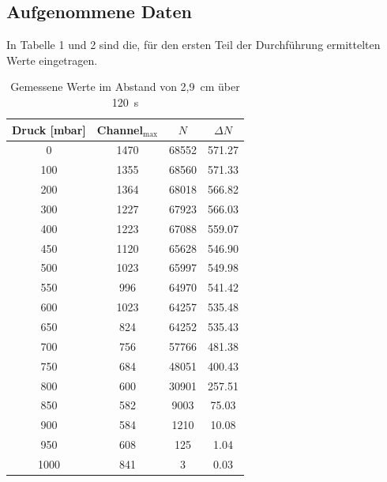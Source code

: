 \subsection{Aufgenommene Daten}
In Tabelle 1 und 2 sind die, für den ersten Teil der Durchführung ermittelten Werte eingetragen.
\begin{table}[H]
\renewcommand{\arraystretch}{.95}
\begin{tabular}{|c|c|c|c|} 
Druck [mbar]	&Channel$_\text{max}$	&$N$	&$\Delta N$\\ \hline
0		&1470	&68552	&571.27\\ \hline
100		&1355	&68560	&571.33\\ \hline
200		&1364	&68018	&566.82\\ \hline
300		&1227	&67923	&566.03\\ \hline
400		&1223	&67088	&559.07\\ \hline
450		&1120	&65628	&546.90\\ \hline
500		&1023	&65997	&549.98\\ \hline
550		&996	&64970	&541.42\\ \hline
600		&1023	&64257	&535.48\\ \hline
650		&824	&64252	&535.43\\ \hline
700		&756	&57766	&481.38\\ \hline
750		&684	&48051	&400.43\\ \hline
800		&600	&30901	&257.51\\ \hline
850		&582	&9003	&75.03\\ \hline
900		&584	&1210	&10.08\\ \hline
950		&608	&125	&1.04\\ \hline
1000	&841	&3		&0.03\\ \hline
\end{tabular}
\renewcommand{\arraystretch}{1}
\caption{Gemessene Werte im Abstand von 2,9~cm über 120~s}
\end{table}

